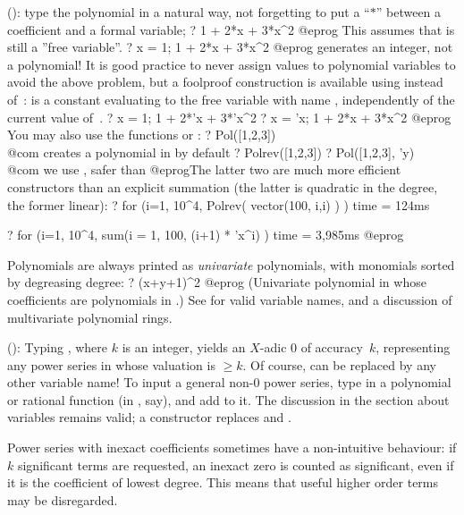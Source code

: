 \label{se:pol}
(): type the polynomial in a natural way, not
forgetting to put a ``$*$'' between a coefficient and a formal variable;
\bprog
? 1 + 2*x + 3*x^2
@eprog\noindent
This assumes that  is still a ''free variable''.
\bprog
? x = 1; 1 + 2*x + 3*x^2
@eprog\noindent
generates an integer, not a polynomial! It is good practice to never assign
values to polynomial variables to avoid the above problem, but a foolproof
construction is available using  instead of~: 
is a constant evaluating to the free variable with name ,
independently of the current value of~.
\bprog
? x = 1; 1 + 2*'x + 3*'x^2
? x = 'x; 1 + 2*x + 3*x^2
@eprog\noindent
You may also use the functions  or :
\bprog
? Pol([1,2,3])         \\@com {} creates a polynomial in  by default
? Polrev([1,2,3])
? Pol([1,2,3], 'y)     \\@com we use , safer than 
@eprog\noindent The latter two are much more efficient constructors than an
explicit summation (the latter is quadratic in the degree, the former linear):
\bprog
? for (i=1, 10^4, Polrev( vector(100, i,i) ) )
time = 124ms

? for (i=1, 10^4, sum(i = 1, 100, (i+1) * 'x^i) )
time = 3,985ms
@eprog

Polynomials are always printed as \emph{univariate} polynomials, with
monomials sorted by degreasing degree:
\bprog
? (x+y+1)^2
@eprog\noindent
(Univariate polynomial in  whose coefficients are polynomials in
.) See  for valid variable names, and a discussion
of multivariate polynomial rings.

\label{se:series}
():
Typing , where $k$ is an integer, yields an $X$-adic $0$ of
accuracy~$k$, representing any power series in  whose valuation is
$\geq k$. Of course,  can be replaced by any other variable name! To
input a general non-0 power series, type in a polynomial or rational
function (in , say), and add  to it. The discussion
in the  section about variables remains valid; a constructor
 replaces  and .

 Power series with inexact coefficients sometimes have a
non-intuitive behaviour: if $k$ significant terms are requested, an inexact
zero is counted as significant, even if it is the coefficient of lowest
degree. This means that useful higher order terms may be disregarded.

